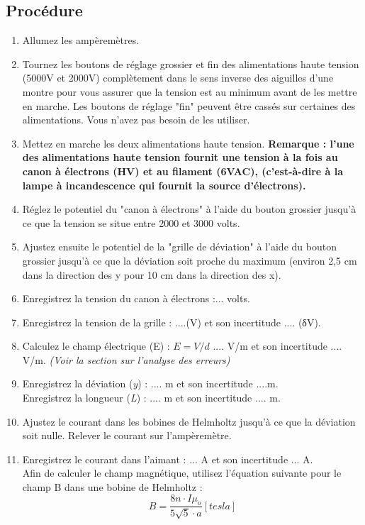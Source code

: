 \documentclass[../main.tex]{subfiles}
\begin{document}
\subsection{Procédure}
\begin{enumerate}
    \item Allumez les ampèremètres. 
    \item Tournez les boutons de réglage grossier et fin des alimentations haute tension (5000V et 2000V) complètement dans le sens inverse des aiguilles d'une montre pour vous assurer que la tension est au minimum avant de les mettre en marche.  Les boutons de réglage "fin" peuvent être cassés sur certaines des alimentations.  Vous n'avez pas besoin de les utiliser. 
    \item Mettez en marche les deux alimentations haute tension.  \textbf{Remarque : l'une des alimentations haute tension fournit une tension à la fois au canon à électrons (HV) et au filament (6VAC), (c'est-à-dire à la lampe à incandescence qui fournit la source d'électrons). }
    \item Réglez le potentiel du "canon à électrons" à l'aide du bouton grossier jusqu'à ce que la tension se situe entre 2000 et 3000 volts. 
    \item Ajustez ensuite le potentiel de la "grille de déviation" à l'aide du bouton grossier jusqu'à ce que la déviation soit proche du maximum (environ 2,5 cm dans la direction des y pour 10 cm dans la direction des x).  
    \item Enregistrez la tension du canon à électrons :... volts.  
    \item Enregistrez la tension de la grille : ....\volts (V) et son incertitude .... \volts (δV).  
    \item Calculez le champ électrique (E) :  $E=V/d$ .... V/m et son incertitude .... V/m.  \textit{(Voir la section sur l'analyse des erreurs)}
    \item Enregistrez la déviation (\textit{y}) : .... m et son incertitude ....m.\\ Enregistrez la longueur (\textit{L}) :   .... m et son incertitude .... m. 
    \item Ajustez le courant dans les bobines de Helmholtz jusqu'à ce que la déviation soit nulle.  Relever le courant sur l'ampèremètre.  
    \item Enregistrez le courant dans l'aimant : ... A et son incertitude ... A. \\
Afin de calculer le champ magnétique, utilisez l'équation suivante pour le champ B dans une bobine de Helmholtz :\\ $$B = \frac{8n \cdot I \mu_o}{5 \sqrt{5} \cdot a} [tesla]$$

\end{enumerate}
\end{document}
